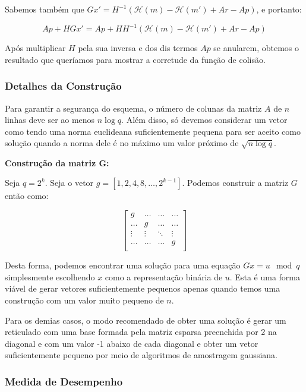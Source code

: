 \documentclass[a4paper]{article}
\begin{document}
Sabemos também que $Gx' = H^{-1}(\mathcal{H}(m) - \mathcal{H}(m') + Ar
- Ap)$, e portanto:

$$
Ap + HGx' = Ap + H H^{-1}(\mathcal{H}(m) - \mathcal{H}(m') + Ar - Ap)
$$

Após multiplicar $H$ pela sua inversa e dos dis termos $Ap$ se
anularem, obtemos o resultado que queríamos para mostrar a corretude
da função de colisão.

\subsubsection{Detalhes da Construção}

Para garantir a segurança do esquema, o número de colunas da matriz
$A$ de $n$ linhas deve ser ao menos $n\log q$. Além disso, só devemos
considerar um vetor como tendo uma norma euclideana suficientemente
pequena para ser aceito como solução quando a norma dele é no máximo
um valor próximo de $\sqrt{n \log q}$.

\textbf{Construção da matriz G:}

Seja $q=2^k$. Seja o vetor $g=[1, 2, 4, 8, \ldots, 2^{k-1}]$. Podemos
construir a matriz $G$ então como:

$$
\left[\begin{matrix}
    g & \ldots & \ldots & \ldots\\
    \ldots & g & \ldots & \ldots\\
    \vdots & \vdots & \ddots & \vdots\\
    \ldots & \ldots & \ldots & g\\
  \end{matrix}\right]
$$

Desta forma, podemos encontrar uma solução para uma equação $Gx=u \mod
q$ simplesmente escolhendo $x$ como a representação binária de
$u$. Esta é uma forma viável de gerar vetores suficientemente pequenos
apenas quando temos uma construção com um valor muito pequeno de $n$.

Para os demias casos, o modo recomendado de obter uma solução é gerar
um reticulado com uma base formada pela matriz esparsa preenchida por
2 na diagonal e com um valor -1 abaixo de cada diagonal e obter um
vetor suficientemente pequeno por meio de algoritmos de amostragem
gaussiana.

\subsubsection{Medida de Desempenho}
\end{document}
